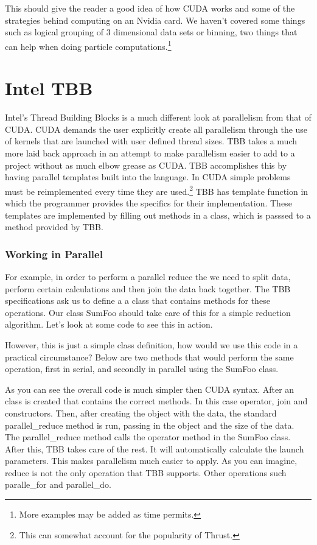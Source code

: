 \documentclass{article}
\newcommand{\comp}[1]{{\ttfamily #1}}
\begin{document}
  This should give the reader a good idea of how CUDA works and some of the strategies behind computing on an Nvidia card. We haven't covered some things such as logical grouping of 3 dimensional data sets or binning, two things that can help when doing particle computations.\footnote{More examples may be added as time permits.}

\part{Intel TBB}
Intel's Thread Building Blocks is a much different look at parallelism from that of CUDA. CUDA demands the user explicitly create all parallelism through the use of kernels that are launched with user defined thread sizes. TBB takes a much more laid back approach in an attempt to make parallelism easier to add to a project without as much elbow grease as CUDA. TBB accomplishes this by having parallel templates built into the language. In CUDA simple problems must be reimplemented every time they are used.\footnote{This can somewhat account for the popularity of Thrust.} TBB has template function in which the programmer provides the specifics for their implementation. These templates are implemented by filling out methods in a class, which is passsed to a method provided by TBB. 

  \section{Working in Parallel}

  For example, in order to perform a parallel reduce the we need to split data, perform certain calculations and then join the data back together. The TBB specifications ask us to define a a class that contains methods for these operations. Our class \comp{SumFoo} should take care of this for a simple reduction algorithm. Let's look at some code to see this in action. 

  

  However, this is just a simple class definition, how would we use this code in a practical circumstance? Below are two methods that would perform the same operation, first in serial, and secondly in parallel using the \comp{SumFoo} class.

  

  As you can see the overall code is much simpler then CUDA syntax. After an class is created that contains the correct methods. In this case \comp{operator}, \comp{join} and constructors. Then, after creating the object with the data, the standard \comp{parallel\_reduce} method is run, passing in the object and the size of the data. The \comp{parallel\_reduce} method calls the \comp{operator} method in the \comp{SumFoo} class. After this, TBB takes care of the rest. It will automatically calculate the launch parameters. This makes parallelism much easier to apply. As you can imagine, reduce is not the only operation that TBB supports. Other operations such \comp{paralle\_for} and \comp{parallel\_do}. 
\end{document}
